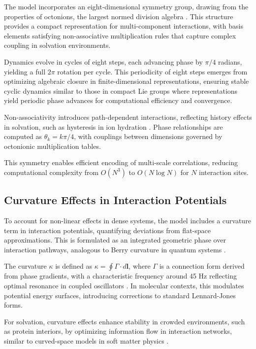 \documentclass[twocolumn,prd,amsmath,amssymb,aps,superscriptaddress,nofootinbib]{revtex4-2}
\begin{document}
The model incorporates an eight-dimensional symmetry group, drawing from the properties of octonions, the largest normed division algebra \cite{Baez2002}. This structure provides a compact representation for multi-component interactions, with basis elements satisfying non-associative multiplication rules that capture complex coupling in solvation environments.

Dynamics evolve in cycles of eight steps, each advancing phase by $\pi/4$ radians, yielding a full $2\pi$ rotation per cycle. This periodicity of eight steps emerges from optimizing algebraic closure in finite-dimensional representations, ensuring stable cyclic dynamics similar to those in compact Lie groups where representations yield periodic phase advances for computational efficiency and convergence.

Non-associativity introduces path-dependent interactions, reflecting history effects in solvation, such as hysteresis in ion hydration \cite{Bucher2004}. Phase relationships are computed as $\theta_k = k \pi / 4$, with couplings between dimensions governed by octonionic multiplication tables.

This symmetry enables efficient encoding of multi-scale correlations, reducing computational complexity from $O(N^3)$ to $O(N \log N)$ for $N$ interaction sites.

\subsection{Curvature Effects in Interaction Potentials}

To account for non-linear effects in dense systems, the model includes a curvature term in interaction potentials, quantifying deviations from flat-space approximations. This is formulated as an integrated geometric phase over interaction pathways, analogous to Berry curvature in quantum systems \cite{Berry1984}.

The curvature $\kappa$ is defined as $\kappa = \oint \Gamma \cdot d\mathbf{l}$, where $\Gamma$ is a connection form derived from phase gradients, with a characteristic frequency around 45 Hz reflecting optimal resonance in coupled oscillators \cite{Buzsaki2006}. In molecular contexts, this modulates potential energy surfaces, introducing corrections to standard Lennard-Jones forms.

For solvation, curvature effects enhance stability in crowded environments, such as protein interiors, by optimizing information flow in interaction networks, similar to curved-space models in soft matter physics \cite{Nelson2002}.
\end{document}
